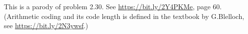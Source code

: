 \documentclass[jou]{apa6}
\begin{document}
This is a parody of problem 2.30. See \url{https://bit.ly/2Y4PKMe}, page 60.
(Arithmetic coding and its code length is defined in the textbook by G.Blelloch, see \url{https://bit.ly/2N3ywsf}.) 











\end{document}
